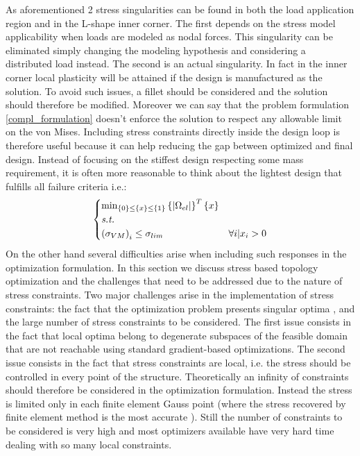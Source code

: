 As aforementioned 2 stress singularities can be found in both the load application region and in the L-shape inner corner. 
The first depends on the stress model applicability when loads are modeled as nodal forces. This singularity can be eliminated simply changing the modeling hypothesis and considering a distributed load instead. The second is an actual singularity. In fact in the inner corner local plasticity will be attained if the design is manufactured as the solution. To avoid such issues, a fillet should be considered and the solution should therefore be modified. 
Moreover we can say that the problem formulation \ref{compl_formulation} doesn't enforce the solution to respect any allowable limit on the von Mises.
Including stress constraints directly inside the design loop is therefore useful because it can help reducing the gap between optimized and final design. Instead of focusing on the stiffest design respecting some mass requirement, it is often more reasonable to think about the lightest design that fulfills all failure criteria i.e.:
\begin{equation}
\label{formulation_stress}
\begin{cases}
\min_{\left\lbrace{0}\right \rbrace\leq\left\lbrace{x}\right \rbrace\leq\left\lbrace{1}\right \rbrace} {\left\lbrace{|\Omega_{el}|}\right \rbrace^T\left\lbrace{x}\right \rbrace} \\
\textit{s.t.}\\
\left(\sigma_{VM}\right)_i\leq \sigma_{lim} & \forall i|x_i>0
\end{cases}
\end{equation}
On the other hand several difficulties arise when including such responses in the optimization formulation. 
In this section we discuss stress based topology optimization and the challenges that need to be addressed due to the nature of stress constraints.
Two major challenges arise in the implementation of stress constraints: the fact that the optimization problem presents singular optima \cite{kirsch1990singular,cheng1997varepsilon,rozvany2001design}, and the large number of stress constraints to be considered.
The first issue consists in the fact that local optima belong to degenerate subspaces of the feasible domain that are not reachable using standard gradient-based optimizations.  The second issue consists in the fact that stress constraints are local, i.e. the stress should be controlled in every point of the structure. Theoretically an infinity of constraints should therefore be considered in the optimization formulation. Instead the stress is limited only in each finite element Gauss point (where the stress recovered by finite element method is the most accurate \cite{zlamal1978superconvergence,zhang2006natural}). Still the number of constraints to be considered is very high and most optimizers available have very hard time dealing with so many local constraints.
